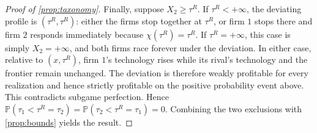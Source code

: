 \documentclass[12pt,reqno]{article}
\renewcommand{\Pr}{\mathbb{P}}
\theoremstyle{definition} \newtheorem{example}{Example}
\theoremstyle{definition} \newtheorem{condition}{Condition}
\theoremstyle{definition} \newtheorem{corollary}{Corollary}
\theoremstyle{definition} \newtheorem{claim}{Claim}
\theoremstyle{definition} \newtheorem{definition}{Definition}
\theoremstyle{definition} \newtheorem{conjecture}{Conjecture}
\theoremstyle{definition} \newtheorem{Lemma}{Lemma}
\theoremstyle{definition} \newtheorem{lemma}{Lemma}
\theoremstyle{plain} \newtheorem{theorem}{Theorem}
\theoremstyle{definition} \newtheorem{assumption}{Assumption}
\theoremstyle{definition} \newtheorem*{assumptionnonumber}{Assumption}
\theoremstyle{definition} \newtheorem*{theoremNoNumber}{Proposition}
\theoremstyle{definition}
\theoremstyle{definition}\newtheorem{proposition}{Proposition}
\theoremstyle{definition} \newtheorem{result}{Result}
\theoremstyle{definition} \newtheorem*{definitionNoNumber}{Definition}
\theoremstyle{definition} \newtheorem{Definition}{Definition}
\theoremstyle{definition} \newtheorem*{DefinitionNoNumber}{Definition}
\theoremstyle{definition} \newtheorem*{fact}{Fact}
\theoremstyle{definition} \newtheorem*{property}{Property}
\theoremstyle{definition} \newtheorem{remark}{Remark}
\begin{document}
\begin{proof}[Proof of \cref{prop:taxonomy}]
Finally, suppose $X_2\geq\tau^R$. If $\tau^R<+\infty$, the deviating
profile is $(\tau^R,\tau^R)$: either the firms stop together at $\tau^R$,
or firm $1$ stops there and firm $2$ responds immediately because
$\chi(\tau^R)=\tau^R$. If $\tau^R=+\infty$, this case is simply
$X_2=+\infty$, and both firms race forever under the deviation. In either
case, relative to $(x,\tau^R)$, firm $1$'s technology rises while its
rival's technology and the frontier remain unchanged.
The deviation is therefore weakly profitable for every realization and hence
strictly profitable on the positive probability event above. This contradicts
subgame perfection. Hence
$
\Pr(\tau_1<\tau^R=\tau_2)
=
\Pr(\tau_2<\tau^R=\tau_1)
=0.$ Combining the two exclusions with \cref{prop:bounds} yields the result. 
\end{proof}
\end{document}

